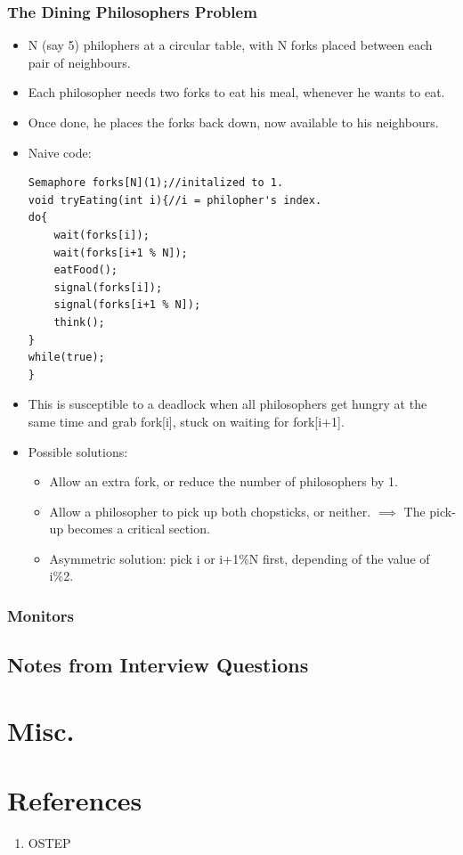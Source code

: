 \documentclass[10pt]{report}
\begin{document}
\subsection{The Dining Philosophers Problem}
\begin{itemize}
\item N (say 5) philophers at a circular table, with N forks placed between each pair of neighbours.
\item Each philosopher needs two forks to eat his meal, whenever he wants to eat.
\item Once done, he places the forks back down, now available to his neighbours.
\item Naive code:
\begin{lstlisting}
Semaphore forks[N](1);//initalized to 1.
void tryEating(int i){//i = philopher's index.
do{
    wait(forks[i]);
    wait(forks[i+1 % N]);
    eatFood();
    signal(forks[i]);
    signal(forks[i+1 % N]);
    think();
}    
while(true);
}
\end{lstlisting}
\item This is susceptible to a deadlock when all philosophers get hungry at the same time and grab fork[i], stuck on waiting for fork[i+1].
\item Possible solutions:
\begin{itemize}
\item Allow an extra fork, or reduce the number of philosophers by 1.
\item Allow a philosopher to pick up both chopsticks, or neither. $\implies$ The pick-up becomes a critical section.
\item Asymmetric solution: pick i or i+1\%N first, depending of the value of i\%2.
\end{itemize}
\end{itemize}
\subsection{Monitors}
\section{Notes from Interview Questions}
\chapter{Misc.}
\chapter{References}
\begin{enumerate}
\item OSTEP
\end{enumerate}
\end{document}

